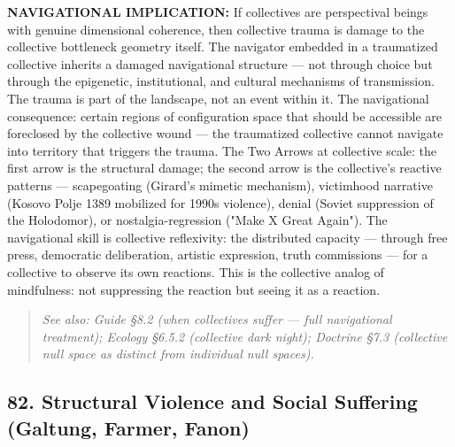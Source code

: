 \textbf{NAVIGATIONAL IMPLICATION:} If collectives are perspectival beings with genuine dimensional coherence, then collective trauma is damage to the collective bottleneck geometry itself. The navigator embedded in a traumatized collective inherits a damaged navigational structure — not through choice but through the epigenetic, institutional, and cultural mechanisms of transmission. The trauma is part of the landscape, not an event within it. The navigational consequence: certain regions of configuration space that should be accessible are foreclosed by the collective wound — the traumatized collective cannot navigate into territory that triggers the trauma. The Two Arrows at collective scale: the first arrow is the structural damage; the second arrow is the collective's reactive patterns — scapegoating (Girard's mimetic mechanism), victimhood narrative (Kosovo Polje 1389 mobilized for 1990s violence), denial (Soviet suppression of the Holodomor), or nostalgia-regression ("Make X Great Again"). The navigational skill is collective reflexivity: the distributed capacity — through free press, democratic deliberation, artistic expression, truth commissions — for a collective to observe its own reactions. This is the collective analog of mindfulness: not suppressing the reaction but seeing it as a reaction.


\begin{quote}
\itshape
\textit{See also: Guide §8.2 (when collectives suffer — full navigational treatment); Ecology §6.5.2 (collective dark night); Doctrine §7.3 (collective null space as distinct from individual null spaces).}
\end{quote}


\bigskip\noindent\makebox[\textwidth]{\color{rulegray}\rule{5cm}{0.3pt}}\bigskip


\subsection*{82. Structural Violence and Social Suffering (Galtung, Farmer, Fanon)}


